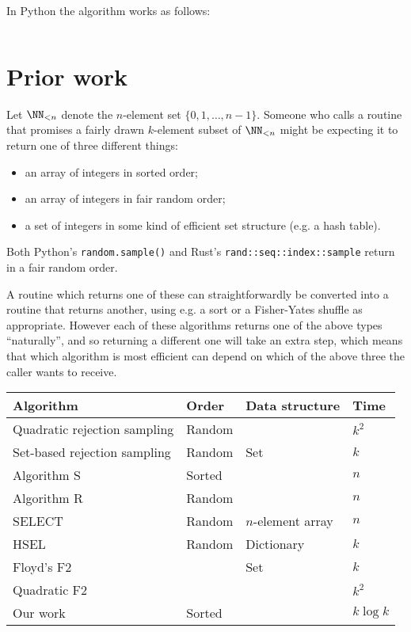 \documentclass[letterpaper,luatex,11pt]{article}
\begin{document}
In Python the algorithm works as follows:

\inputminted{Python}{code/cardchoose.py}

\section{Prior work}\label{priorwork}
Let \(\NN_{<n}\) denote the \(n\)-element set \(\{0, 1, \ldots, n-1\}\). Someone who calls a routine that promises a fairly drawn \(k\)-element subset of
\(\NN_{<n}\) might be expecting it to return one of three different things:

\begin{itemize}
    \item an array of integers in sorted order;
    \item an array of integers in fair random order;
    \item a set of integers in some kind of efficient set structure (e.g. a hash table).
\end{itemize}

Both Python's \texttt{random.sample()} and 
Rust's \texttt{rand::seq::index::sample} return in a fair random order.

A routine which returns one of these can straightforwardly be converted into 
a routine that returns another, using e.g. a sort or a Fisher-Yates shuffle as appropriate.
However each of these algorithms returns one of the above types ``naturally'', and
so returning a different one will take an extra step, which means that which algorithm
is most efficient can depend on which of the above three the caller wants to receive.

\begin{center}
    \begin{tabular}{l|l|l|l}
    Algorithm & Order & Data structure & Time \\
    \hline
    Quadratic rejection sampling & Random &  & \(k^2\) \\
    Set-based rejection sampling & Random & Set & \(k\) \\
    Algorithm S & Sorted &  & \(n\) \\
    Algorithm R & Random &  & \(n\) \\
    SELECT & Random & \(n\)-element array & \(n\) \\
    HSEL & Random & Dictionary & \(k\) \\
    Floyd's F2 &  & Set & \(k\) \\
    Quadratic F2 &  & & \(k^2\) \\
    Our work & Sorted &  & \(k \log k\)
    \end{tabular}
\end{center}
\end{document}
